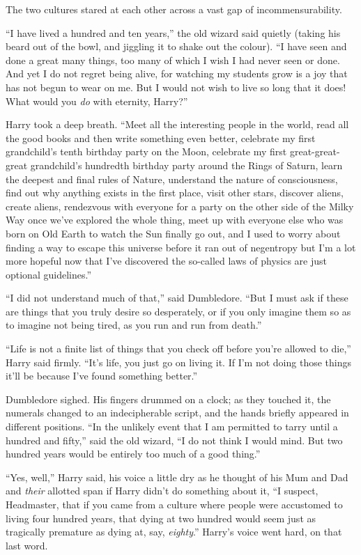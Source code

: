 The two cultures stared at each other across a vast gap of
incommensurability.

``I have lived a hundred and ten years,'' the old wizard said quietly
(taking his beard out of the bowl, and jiggling it to shake out the
colour). ``I have seen and done a great many things, too many of which I
wish I had never seen or done. And yet I do not regret being alive, for
watching my students grow is a joy that has not begun to wear on me. But
I would not wish to live so long that it does! What would you \emph{do}
with eternity, Harry?''

Harry took a deep breath. ``Meet all the interesting people in the
world, read all the good books and then write something even better,
celebrate my first grandchild's tenth birthday party on the Moon,
celebrate my first great-great-great grandchild's hundredth birthday
party around the Rings of Saturn, learn the deepest and final rules of
Nature, understand the nature of consciousness, find out why anything
exists in the first place, visit other stars, discover aliens, create
aliens, rendezvous with everyone for a party on the other side of the
Milky Way once we've explored the whole thing, meet up with everyone
else who was born on Old Earth to watch the Sun finally go out, and I
used to worry about finding a way to escape this universe before it ran
out of negentropy but I'm a lot more hopeful now that I've discovered
the so-called laws of physics are just optional guidelines.''

``I did not understand much of that,'' said Dumbledore. ``But I must ask
if these are things that you truly desire so desperately, or if you only
imagine them so as to imagine not being tired, as you run and run from
death.''

``Life is not a finite list of things that you check off before you're
allowed to die,'' Harry said firmly. ``It's life, you just go on living
it. If I'm not doing those things it'll be because I've found something
better.''

Dumbledore sighed. His fingers drummed on a clock; as they touched it,
the numerals changed to an indecipherable script, and the hands briefly
appeared in different positions. ``In the unlikely event that I am
permitted to tarry until a hundred and fifty,'' said the old wizard, ``I
do not think I would mind. But two hundred years would be entirely too
much of a good thing.''

``Yes, well,'' Harry said, his voice a little dry as he thought of his
Mum and Dad and \emph{their} allotted span if Harry didn't do something
about it, ``I suspect, Headmaster, that if you came from a culture where
people were accustomed to living four hundred years, that dying at two
hundred would seem just as tragically premature as dying at, say,
\emph{eighty}.'' Harry's voice went hard, on that last word.

